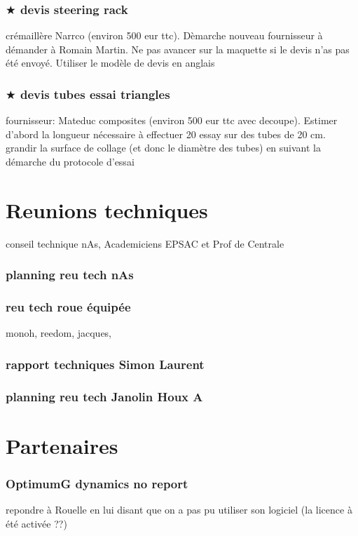 		\subsubsection*{$\bigstar$ devis steering rack} 
 \par crémaillère Narrco (environ 500 eur ttc). Dèmarche nouveau fournisseur à démander à Romain Martin. Ne pas avancer sur la maquette si le devis n'as pas été envoyé. Utiliser le modèle de devis en anglais
		\subsubsection*{$\bigstar$ devis tubes essai triangles} 
 \par fournisseur: Mateduc composites (environ 500 eur ttc avec decoupe). Estimer d'abord la longueur nécessaire à effectuer 20 essay sur des tubes de 20 cm. grandir la surface de collage (et donc le diamètre des tubes) en suivant la démarche du protocole d'essai
\newpage 
 \section*{Reunions techniques} 
 \par conseil technique nAs, Academiciens EPSAC et Prof de Centrale
		\subsubsection*{planning reu tech nAs} 
 \par 
		\subsubsection*{reu tech roue équipée} 
 \par monoh, reedom, jacques, 
		\subsubsection*{rapport techniques Simon Laurent} 
 \par 
		\subsubsection*{planning reu tech Janolin Houx A} 
 \par 
\newpage 
 \section*{Partenaires} 
 \par 
		\subsubsection*{OptimumG dynamics no report} 
 \par repondre à Rouelle en lui disant que on a pas pu utiliser son logiciel (la licence à été activée ??)
